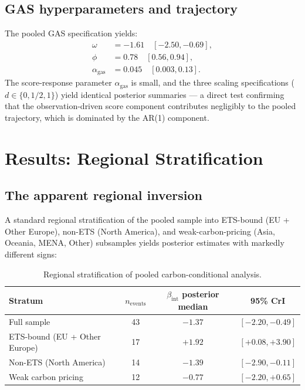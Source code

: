 \documentclass[11pt,a4paper]{article}
\newcommand{\bint}{\beta_{\mathrm{int}}}
\begin{document}
\subsection{GAS hyperparameters and trajectory}

The pooled GAS specification yields:
\begin{align*}
\omega &= -1.61 \quad [-2.50, -0.69], \\
\phi &= 0.78 \quad [0.56, 0.94], \\
\alpha_{\mathrm{gas}} &= 0.045 \quad [0.003, 0.13].
\end{align*}
The score-response parameter $\alpha_{\mathrm{gas}}$ is small, and the three scaling specifications ($d \in \{0, 1/2, 1\}$) yield identical posterior summaries — a direct test confirming that the observation-driven score component contributes negligibly to the pooled trajectory, which is dominated by the AR(1) component.

\section{Results: Regional Stratification}
\label{sec:ch7-results-stratified}

\subsection{The apparent regional inversion}

A standard regional stratification of the pooled sample into ETS-bound (EU + Other Europe), non-ETS (North America), and weak-carbon-pricing (Asia, Oceania, MENA, Other) subsamples yields posterior estimates with markedly different signs:

\begin{table}[h!]
\centering
\caption{Regional stratification of pooled carbon-conditional analysis.}
\begin{tabular}{lccc}
\toprule
Stratum & $n_{\mathrm{events}}$ & $\bint$ posterior median & 95\% CrI \\
\midrule
Full sample & 43 & $-1.37$ & $[-2.20, -0.49]$ \\
ETS-bound (EU + Other Europe) & 17 & $\mathbf{+1.92}$ & $\mathbf{[+0.08, +3.90]}$ \\
Non-ETS (North America) & 14 & $-1.39$ & $[-2.90, -0.11]$ \\
Weak carbon pricing & 12 & $-0.77$ & $[-2.20, +0.65]$ \\
\bottomrule
\end{tabular}
\label{tab:ch7-regional}
\end{table}
\end{document}
